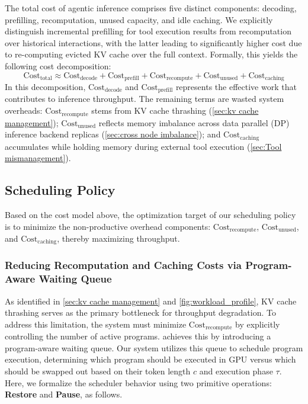 The total cost of agentic inference comprises five distinct components: decoding, prefilling, recomputation, unused capacity, and idle caching. We explicitly distinguish incremental prefilling for tool execution results from recomputation over historical interactions, with the latter leading to significantly higher cost due to re-computing evicted KV cache over the full context. Formally, this yields the following cost decomposition:
\begin{equation}
    \text{Cost}_{\text{total}} \approx \text{Cost}_{\text{decode}} + \text{Cost}_{\text{prefill}} + \text{Cost}_{\text{recompute}} +
    \text{Cost}_{\text{unused}} + \text{Cost}_{\text{caching}}
    \label{eq:cost_decomp}
\end{equation}
\noindent In this decomposition, $\text{Cost}_{\text{decode}}$ and  $\text{Cost}_{\text{prefill}}$ represents the effective work that contributes to inference throughput. The remaining terms are wasted system overheads: $\text{Cost}_{\text{recompute}}$ stems from KV cache thrashing (\autoref{sec:kv cache management}); $\text{Cost}_{\text{unused}}$ reflects memory imbalance across data parallel (DP) inference backend replicas (\autoref{sec:cross node imbalance}); and $\text{Cost}_{\text{caching}}$ accumulates while holding memory during external tool execution (\autoref{sec:Tool mismanagement}).

\subsection{Scheduling Policy}
\label{sec:scheduling_policy}
Based on the cost model above, the optimization target of our scheduling policy is to minimize the non-productive overhead components: $\text{Cost}_{\text{recompute}}$, $\text{Cost}_{\text{unused}}$, and $\text{Cost}_{\text{caching}}$, thereby maximizing throughput.

\subsubsection{Reducing Recomputation and Caching Costs via Program-Aware Waiting Queue}
\label{sec:4.3.1}
As identified in \autoref{sec:kv cache management} and \autoref{fig:workload_profile}, KV cache thrashing serves as the primary bottleneck for throughput degradation. To address this limitation, the system must minimize $\text{Cost}_{\text{recompute}}$ by explicitly controlling the number of active programs. \ouralg achieves this by introducing a program-aware waiting queue. Our system utilizes this queue to schedule program execution, determining which program should be executed in GPU versus which should be swapped out based on their token length $c$ and execution phase $\tau$. Here, we formalize the scheduler behavior using two primitive operations: \textbf{Restore} and \textbf{Pause}, as follows.

